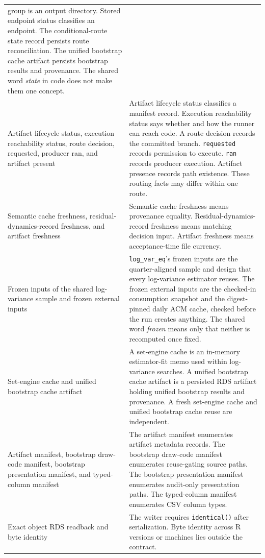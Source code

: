 \documentclass[11pt]{article}
\DeclareRobustCommand{\code}[1]{%
  \ifmmode\text{\ttfamily\detokenize{#1}}\else\nolinkurl{#1}\fi}
\begin{document}
\begin{longtable}{@{}>{\raggedright\arraybackslash}p{}
  >{\raggedright\arraybackslash}p{}@{}}
group is an output directory. Stored endpoint status classifies an endpoint.
The conditional-route state record persists route reconciliation. The unified
bootstrap cache artifact persists bootstrap results and provenance. The shared
word \emph{state} in code does not make them one concept.\\
Artifact lifecycle status, execution reachability status, route decision,
requested, producer ran, and artifact present & Artifact lifecycle status
classifies a manifest record. Execution reachability status says whether and how
the runner can reach code. A route decision records the committed branch.
\code{requested} records
permission to execute. \code{ran} records producer execution. Artifact presence
records path existence. These routing facts may differ within one route.\\
Semantic cache freshness, residual-dynamics-record freshness, and artifact
freshness & Semantic cache freshness means provenance equality.
Residual-dynamics-record freshness means matching decision input. Artifact
freshness means acceptance-time file currency.\\
Frozen inputs of the shared log-variance sample and frozen external inputs &
\code{log_var_eq}'s frozen inputs are the quarter-aligned sample and design that
every log-variance estimator reuses. The frozen external inputs are the
checked-in consumption snapshot and the digest-pinned daily ACM cache, checked
before the run creates anything. The shared word \emph{frozen} means only that
neither is recomputed once fixed.\\
Set-engine cache and unified bootstrap cache artifact & A set-engine cache is an
in-memory estimator-fit memo used within log-variance searches. A unified
bootstrap cache artifact is a
persisted RDS artifact holding unified bootstrap results and provenance.
A fresh set-engine cache and unified bootstrap cache reuse are independent.\\
Artifact manifest, bootstrap draw-code manifest, bootstrap presentation
manifest, and typed-column manifest & The artifact manifest enumerates artifact
metadata records. The bootstrap draw-code manifest enumerates reuse-gating source
paths. The bootstrap presentation manifest enumerates audit-only presentation
paths. The typed-column manifest enumerates CSV column types.\\
Exact object RDS readback and byte identity & The writer requires
\code{identical()} after serialization. Byte identity across R versions or
machines lies outside the contract.\\

\end{longtable}
\end{document}
